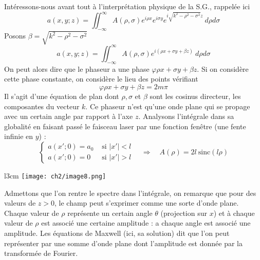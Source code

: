 Intéressons-nous avant tout à l'interprétation physique de la S.G., rappelée ici
\begin{equation}
a(x,y;z) = \iint_{-\infty}^\infty A(\rho,\sigma)e^{i\rho x}e^{i\sigma y} e^{i\sqrt{k^2-\rho^2-
\sigma^2}z}\ d\rho d\sigma
\end{equation}
Posons $\beta = \sqrt{k^2-\rho^2-\sigma^2}$
\begin{equation}
a(x,y;z) = \iint_{-\infty}^\infty A(\rho,\sigma)e^{i(\rho x + \sigma y + \beta z)}\ d\rho d\sigma
\end{equation}
On peut alors dire que le phaseur a une phase $\varphi \rho x + \sigma y + \beta z$. Si on considère 
cette phase constante, on considère le lieu des points vérifiant 
\begin{equation}
\varphi \rho x + \sigma y + \beta z = 2m\pi
\end{equation}
Il s'agit d'une équation de plan dont $\rho,\sigma$ et $\beta$ sont les cosinus directeur, les 
composantes du vecteur $k$. Ce phaseur n'est qu'une onde plane qui se propage avec un certain 
angle par rapport à l'axe $z$. Analysons l'intégrale dans sa globalité en faisant passé le 
faisceau laser par une fonction fenêtre (une fente infinie en $y$) :
\begin{equation}
\left\{\begin{array}{ll}
a(x';0) = a_0 & \text{ si } |x'| < l\\
a(x';0) = 0 & \text{ si } |x'| > l
\end{array}\right.\quad \Rightarrow\quad A(\rho) = 2l\ \text{sinc}(l\rho)
\end{equation}


\begin{wrapfigure}[7]{l}{3cm}
\vspace{-4mm}
\texttt{[image: ch2/image8.png]}
\end{wrapfigure}
Admettons que l'on rentre le spectre dans l'intégrale, on remarque que pour des valeurs de $z>0$, 
le champ peut s'exprimer comme une sorte d'onde plane. Chaque valeur de $\rho$ représente un certain 
angle $\theta$ (projection sur $x$) et à chaque valeur de $\rho$ est associé une certaine amplitude : 
a chaque angle est associé une amplitude. Les équations de Maxwell (ici, sa solution) dit que l'on 
peut représenter par une somme d'onde plane dont l'amplitude est donnée par la transformée de 
Fourier.\\

